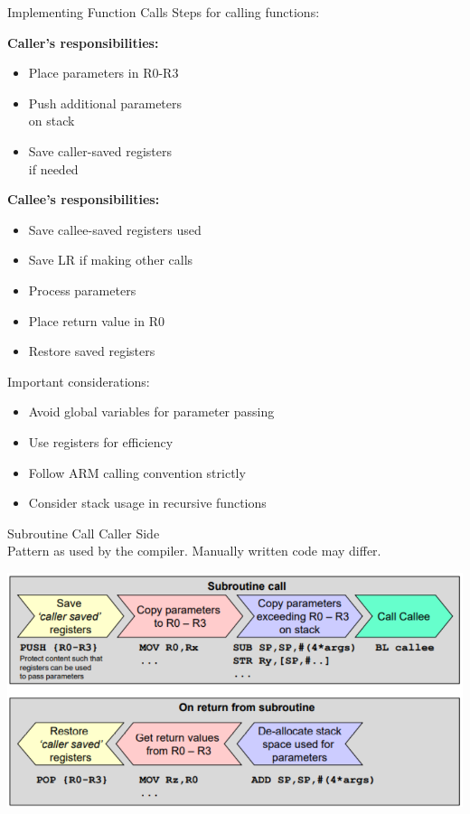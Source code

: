 \begin{KR}{Implementing Function Calls}
Steps for calling functions:

\begin{minipage}[t]{0.5\textwidth}
  \textbf{Caller's responsibilities:}
    \begin{itemize}
      \item Place parameters in R0-R3
      \item Push additional parameters \\on stack
      \item Save caller-saved registers \\if needed
    \end{itemize}
\end{minipage}
\begin{minipage}[t]{0.5\textwidth}  
  \textbf{Callee's responsibilities:}
    \begin{itemize}
      \item Save callee-saved registers used
      \item Save LR if making other calls
      \item Process parameters
      \item Place return value in R0
      \item Restore saved registers
    \end{itemize}
\end{minipage}
\end{KR}

\begin{remark}
Important considerations:
\begin{itemize}
  \item Avoid global variables for parameter passing
  \item Use registers for efficiency
  \item Follow ARM calling convention strictly
  \item Consider stack usage in recursive functions
\end{itemize}
\end{remark}

\begin{definition}{Subroutine Call} Caller Side\\
Pattern as used by the compiler. Manually written code may differ.

  \includegraphics[width=\linewidth]{images/subroutine_call_callerside.png}
\end{definition}


